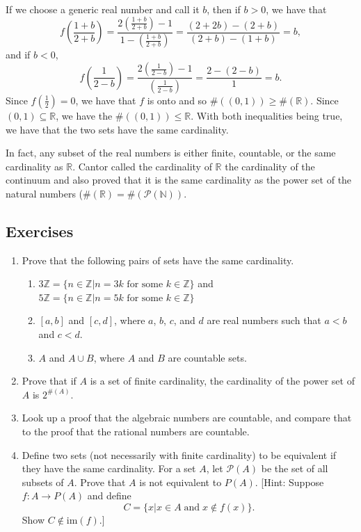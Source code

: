\documentclass[
]{book}
\providecommand{\tightlist}{%
  \setlength{\itemsep}{0pt}\setlength{\parskip}{0pt}}
\theoremstyle{definition}
\theoremstyle{definition}
\theoremstyle{definition}
\theoremstyle{definition}
\theoremstyle{remark}
\begin{document}
If we choose a generic real number and call it \(b\), then if \(b>0\), we have that
\[f\left( \frac{1+b}{2+b} \right) = \frac{2\left(\frac{1+b}{2+b}\right) -1}{1-\left(\frac{1+b}{2+b}\right)} = \frac{(2+2b)-(2+b)}{(2+b)-(1+b)} = b,\] and if \(b<0\),
\[f\left( \frac{1}{2-b}\right) = \frac{2\left(\frac{1}{2-b}\right) -1}{\left(\frac{1}{2-b}\right)} = \frac{2-(2-b)}{1} = b.\] Since \(f\left(\frac{1}{2}\right)=0\), we have that \(f\) is onto and so \(\# ((0,1)) \geq \# (\mathbb{R})\). Since \((0,1)\subseteq \mathbb{R}\), we have the \(\#((0,1)) \leq \mathbb{R}\). With both inequalities being true, we have that the two sets have the same cardinality.

In fact, any subset of the real numbers is either finite, countable, or the same cardinality as \(\mathbb{R}\). Cantor called the cardinality of \(\mathbb{R}\) the cardinality of the continuum and also proved that it is the same cardinality as the power set of the natural numbers (\(\#(\mathbb{R}) = \#(\mathcal{P}(\mathbb{N}))\).

\hypertarget{exercises-20}{%
\subsection{Exercises}\label{exercises-20}}

\begin{enumerate}
\def\labelenumi{\arabic{enumi}.}
\item
  Prove that the following pairs of sets have the same cardinality.

  \begin{enumerate}
  \def\labelenumii{\alph{enumii}.}
  \tightlist
  \item
    \(3\mathbb{Z} = \{n\in \mathbb{Z}\vert n=3k \mbox{ for some } k\in \mathbb{Z}\}\) and \(5\mathbb{Z} = \{n\in \mathbb{Z}\vert n=5k \mbox{ for some } k\in \mathbb{Z}\}\)
  \item
    \([a,b]\) and \([c,d]\), where \(a\), \(b\), \(c\), and \(d\) are real numbers such that \(a<b\) and \(c<d\).
  \item
    \(A\) and \(A\cup B\), where \(A\) and \(B\) are countable sets.
  \end{enumerate}
\item
  Prove that if \(A\) is a set of finite cardinality, the cardinality of the power set of \(A\) is \(2^{\#(A)}\).
\item
  Look up a proof that the algebraic numbers are countable, and compare that to the proof that the rational numbers are countable.
\item
  Define two sets (not necessarily with finite cardinality) to be equivalent if they have the same cardinality.
  For a set \(A\), let \(\mathcal{P}(A)\) be the set of all subsets of \(A\). Prove that \(A\) is not equivalent to \(P(A)\). {[}Hint: Suppose \(f:A\rightarrow P(A)\) and define \[C=\{ x\vert  x\in A \; \mbox{and} \; x\not \in f(x) \}.\] Show \(C\not \in \mbox{im}(f)\).{]}
\end{enumerate}
\end{document}

